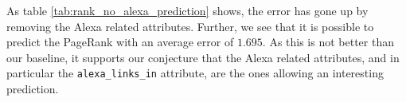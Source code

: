 As table \ref{tab:rank_no_alexa_prediction} shows, the error has gone up by removing the Alexa related attributes. Further, we see that it is possible to predict the PageRank with an average error of $1.695$. As this is not better than our baseline, it supports our conjecture that the {Alexa} related attributes, and in particular the \texttt{alexa\_links\_in} attribute, are the ones allowing an interesting prediction.